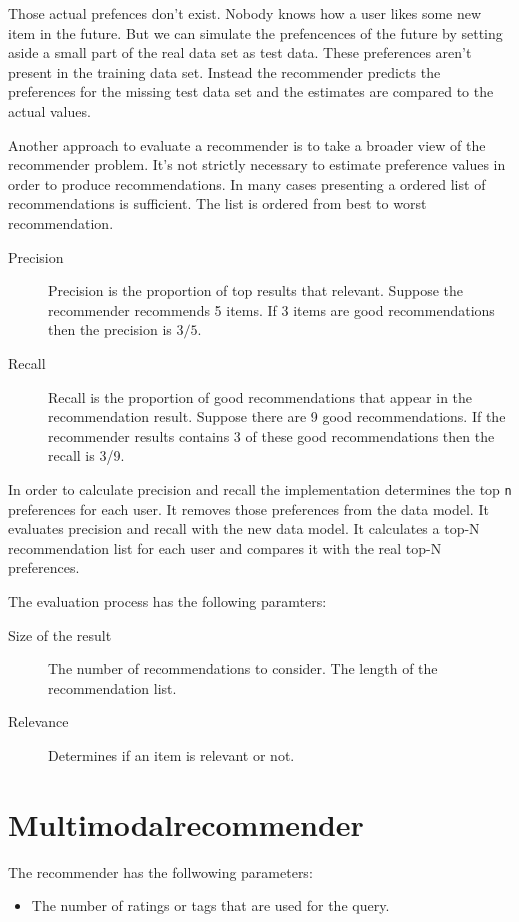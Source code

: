 \documentclass[twoside,a4paper]{article}
\begin{document}
Those actual prefences don't exist. Nobody knows how a user likes some new item in the future.
But we can simulate the prefencences of the future by setting aside a small part of the real data set as test data. These preferences aren't present in the training data set. Instead the recommender predicts the preferences for the missing test data set and the estimates are compared to the actual values.

Another approach to evaluate a recommender is to take a broader view of the recommender problem. It's not strictly necessary to estimate preference values in order to produce recommendations. In many cases presenting a ordered list of recommendations is sufficient. The list is ordered from best to worst recommendation.

\begin{description}
\item[Precision] Precision is the proportion of top results that relevant. Suppose the recommender recommends 5 items. If 3 items are good recommendations then the precision is $3/5$.
\item[Recall] Recall is the proportion of good recommendations that appear in the recommendation result. Suppose there are 9 good recommendations. If the recommender results contains 3 of these good recommendations then the recall is 3/9.
\end{description}

In order to calculate precision and recall the implementation determines the top \verb|n| preferences for each user. It removes those preferences from the data model. It evaluates precision and recall with the new data model. It calculates a top-N recommendation list for each user and compares it with the real top-N preferences.

The evaluation process has the following paramters:
\begin{description}
\item[Size of the result] The number of recommendations to consider. The length of the recommendation list.
\item[Relevance] Determines if an item is relevant or not.
\end{description}

\section{Multimodalrecommender}
\label{sec:multimodalrecommender}

The recommender has the follwowing parameters:
\begin{itemize}
\item The number of ratings or tags that are used for the query.
\end{itemize}
\end{document}
